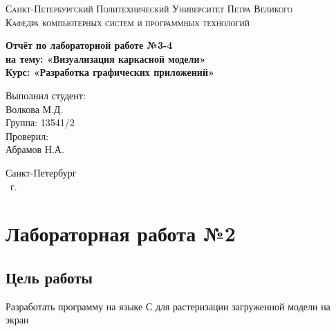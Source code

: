 \documentclass[14pt,a4paper,report]{report}
\begin{document}
\def\contentsname{Содержание}

\begin{titlepage}
\begin{center}
\textsc{Санкт-Петербургский Политехнический 
Университет Петра Великого\\[5mm]
Кафедра компьютерных систем и программных технологий}

\vfill

\textbf{Отчёт по лабораторной работе №3-4\\[3mm]
на тему: «Визуализация каркасной модели»\\[3mm]
Курс: «Разработка графических приложений»\\[41mm]
}
\end{center}

\hfill
\begin{minipage}{.4\textwidth}
Выполнил студент:\\[2mm] 
Волкова М.Д.\\
Группа: 13541/2\\[5mm]

Проверил:\\[2mm] 
Абрамов Н.А.
\end{minipage}
\vfill
\begin{center}
Санкт-Петербург\\ \the\year\ г.
\end{center}
\end{titlepage}

\tableofcontents
\clearpage

\chapter{Лабораторная работа №2}

\section{Цель работы}
Разработать программу на языке С для растеризации загруженной модели на экран
\end{document}
